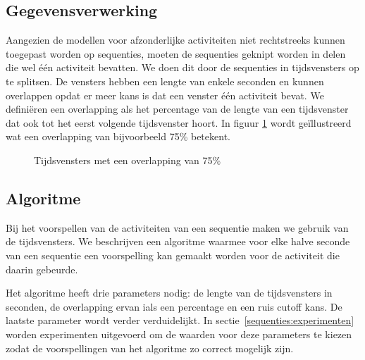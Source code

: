 \documentclass{article}
\begin{document}
\subsection{Gegevensverwerking}

Aangezien de modellen voor afzonderlijke activiteiten niet rechtstreeks kunnen toegepast worden op sequenties, moeten de sequenties geknipt worden in delen die wel \'e\'en activiteit bevatten. We doen dit door de sequenties in tijdsvensters op te splitsen. De vensters hebben een lengte van enkele seconden en kunnen overlappen opdat er meer kans is dat een venster \'e\'en activiteit bevat. We defini\"eren een overlapping als het percentage van de lengte van een tijdsvenster dat ook tot het eerst volgende tijdsvenster hoort. In figuur \ref{fig:overlap} wordt ge\"illustreerd wat een overlapping van bijvoorbeeld 75\% betekent.

\begin{figure}
\begin{center}
\end{center}
\caption{Tijdsvensters met een overlapping van 75\%}
\label{fig:overlap}
\end{figure}

\subsection{Algoritme}

Bij het voorspellen van de activiteiten van een sequentie maken we gebruik van de tijdsvensters. We beschrijven een algoritme waarmee voor elke halve seconde van een sequentie een voorspelling kan gemaakt worden voor de activiteit die daarin gebeurde.

Het algoritme heeft drie parameters nodig: de lengte van de tijdsvensters in seconden, de overlapping ervan ials een percentage en een ruis cutoff kans. De laatste parameter wordt verder verduidelijkt. In sectie~\ref{sequenties:experimenten} worden experimenten uitgevoerd om de waarden voor deze parameters te kiezen zodat de voorspellingen van het algoritme zo correct mogelijk zijn.
\end{document}
